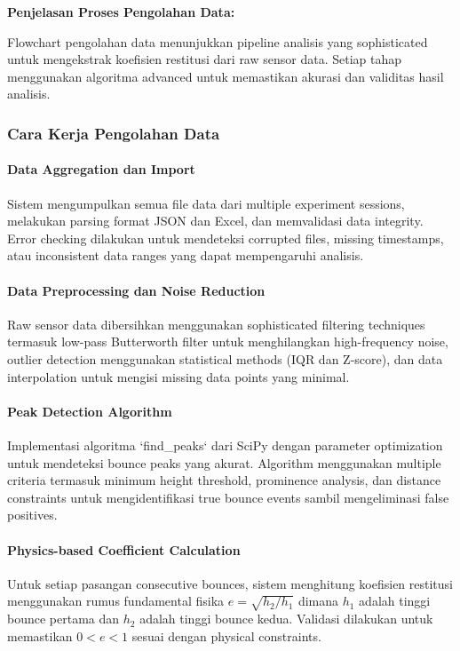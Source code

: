 \textbf{Penjelasan Proses Pengolahan Data:}

Flowchart pengolahan data menunjukkan pipeline analisis yang sophisticated untuk mengekstrak koefisien restitusi dari raw sensor data. Setiap tahap menggunakan algoritma advanced untuk memastikan akurasi dan validitas hasil analisis.

\subsubsection{Cara Kerja Pengolahan Data}


\paragraph{Data Aggregation dan Import} Sistem mengumpulkan semua file data dari multiple experiment sessions, melakukan parsing format JSON dan Excel, dan memvalidasi data integrity. Error checking dilakukan untuk mendeteksi corrupted files, missing timestamps, atau inconsistent data ranges yang dapat mempengaruhi analisis.

\paragraph{Data Preprocessing dan Noise Reduction} Raw sensor data dibersihkan menggunakan sophisticated filtering techniques termasuk low-pass Butterworth filter untuk menghilangkan high-frequency noise, outlier detection menggunakan statistical methods (IQR dan Z-score), dan data interpolation untuk mengisi missing data points yang minimal.

\paragraph{Peak Detection Algorithm} Implementasi algoritma `find\_peaks` dari SciPy dengan parameter optimization untuk mendeteksi bounce peaks yang akurat. Algorithm menggunakan multiple criteria termasuk minimum height threshold, prominence analysis, dan distance constraints untuk mengidentifikasi true bounce events sambil mengeliminasi false positives.

\paragraph{Physics-based Coefficient Calculation} Untuk setiap pasangan consecutive bounces, sistem menghitung koefisien restitusi menggunakan rumus fundamental fisika $e = \sqrt{h_2/h_1}$ dimana $h_1$ adalah tinggi bounce pertama dan $h_2$ adalah tinggi bounce kedua. Validasi dilakukan untuk memastikan $0 < e < 1$ sesuai dengan physical constraints.

